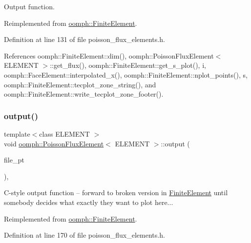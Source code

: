 Output function. 



Reimplemented from \hyperlink{classoomph_1_1FiniteElement_afa9d9b2670f999b43e6679c9dd28c457}{oomph\+::\+Finite\+Element}.



Definition at line 131 of file poisson\+\_\+flux\+\_\+elements.\+h.



References oomph\+::\+Finite\+Element\+::dim(), oomph\+::\+Poisson\+Flux\+Element$<$ E\+L\+E\+M\+E\+N\+T $>$\+::get\+\_\+flux(), oomph\+::\+Finite\+Element\+::get\+\_\+s\+\_\+plot(), i, oomph\+::\+Face\+Element\+::interpolated\+\_\+x(), oomph\+::\+Finite\+Element\+::nplot\+\_\+points(), s, oomph\+::\+Finite\+Element\+::tecplot\+\_\+zone\+\_\+string(), and oomph\+::\+Finite\+Element\+::write\+\_\+tecplot\+\_\+zone\+\_\+footer().

\mbox{\label{classoomph_1_1PoissonFluxElement_a06e4e314f0173f14d804dfa653194570}} 
\subsubsection{\texorpdfstring{output()}{output()}\hspace{0.1cm}{\footnotesize\ttfamily [3/4]}}
{\footnotesize\ttfamily template$<$class E\+L\+E\+M\+E\+NT $>$ \\
void \hyperlink{classoomph_1_1PoissonFluxElement}{oomph\+::\+Poisson\+Flux\+Element}$<$ E\+L\+E\+M\+E\+NT $>$\+::output (\begin{DoxyParamCaption}\item[{F\+I\+LE $\ast$}]{file\+\_\+pt }\end{DoxyParamCaption})\hspace{0.3cm}{\ttfamily [inline]}, {\ttfamily [virtual]}}

C-\/style output function -- forward to broken version in \hyperlink{classoomph_1_1FiniteElement}{Finite\+Element} until somebody decides what exactly they want to plot here... 

Reimplemented from \hyperlink{classoomph_1_1FiniteElement_a72cddd09f8ddbee1a20a1ff404c6943e}{oomph\+::\+Finite\+Element}.



Definition at line 170 of file poisson\+\_\+flux\+\_\+elements.\+h.



